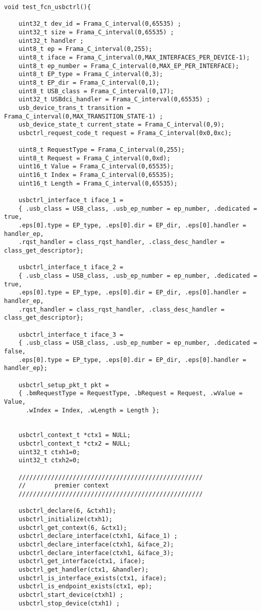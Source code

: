 \begin{lstlisting}[style=CStyle]
void test_fcn_usbctrl(){

    uint32_t dev_id = Frama_C_interval(0,65535) ;
    uint32_t size = Frama_C_interval(0,65535) ;
    uint32_t handler ;
    uint8_t ep = Frama_C_interval(0,255);
    uint8_t iface = Frama_C_interval(0,MAX_INTERFACES_PER_DEVICE-1);
    uint8_t ep_number = Frama_C_interval(0,MAX_EP_PER_INTERFACE);
    uint8_t EP_type = Frama_C_interval(0,3);
    uint8_t EP_dir = Frama_C_interval(0,1);
    uint8_t USB_class = Frama_C_interval(0,17);
    uint32_t USBdci_handler = Frama_C_interval(0,65535) ;
    usb_device_trans_t transition = Frama_C_interval(0,MAX_TRANSITION_STATE-1) ;
    usb_device_state_t current_state = Frama_C_interval(0,9);
    usbctrl_request_code_t request = Frama_C_interval(0x0,0xc);

    uint8_t RequestType = Frama_C_interval(0,255);
    uint8_t Request = Frama_C_interval(0,0xd);
    uint16_t Value = Frama_C_interval(0,65535);
    uint16_t Index = Frama_C_interval(0,65535);
    uint16_t Length = Frama_C_interval(0,65535);

    usbctrl_interface_t iface_1 =
    { .usb_class = USB_class, .usb_ep_number = ep_number, .dedicated = true,
    .eps[0].type = EP_type, .eps[0].dir = EP_dir, .eps[0].handler = handler_ep,
    .rqst_handler = class_rqst_handler, .class_desc_handler = class_get_descriptor};

    usbctrl_interface_t iface_2 =
    { .usb_class = USB_class, .usb_ep_number = ep_number, .dedicated = true,
    .eps[0].type = EP_type, .eps[0].dir = EP_dir, .eps[0].handler = handler_ep,
    .rqst_handler = class_rqst_handler, .class_desc_handler = class_get_descriptor};

    usbctrl_interface_t iface_3 =
    { .usb_class = USB_class, .usb_ep_number = ep_number, .dedicated = false,
    .eps[0].type = EP_type, .eps[0].dir = EP_dir, .eps[0].handler = handler_ep};

    usbctrl_setup_pkt_t pkt =
    { .bmRequestType = RequestType, .bRequest = Request, .wValue = Value,
      .wIndex = Index, .wLength = Length };


    usbctrl_context_t *ctx1 = NULL;
    usbctrl_context_t *ctx2 = NULL;
    uint32_t ctxh1=0;
    uint32_t ctxh2=0;

    ///////////////////////////////////////////////////
    //        premier context
    ///////////////////////////////////////////////////

    usbctrl_declare(6, &ctxh1);
    usbctrl_initialize(ctxh1);
    usbctrl_get_context(6, &ctx1);
    usbctrl_declare_interface(ctxh1, &iface_1) ;
    usbctrl_declare_interface(ctxh1, &iface_2);
    usbctrl_declare_interface(ctxh1, &iface_3);
    usbctrl_get_interface(ctx1, iface);
    usbctrl_get_handler(ctx1, &handler);
    usbctrl_is_interface_exists(ctx1, iface);
    usbctrl_is_endpoint_exists(ctx1, ep);
    usbctrl_start_device(ctxh1) ;
    usbctrl_stop_device(ctxh1) ;


\end{lstlisting}
